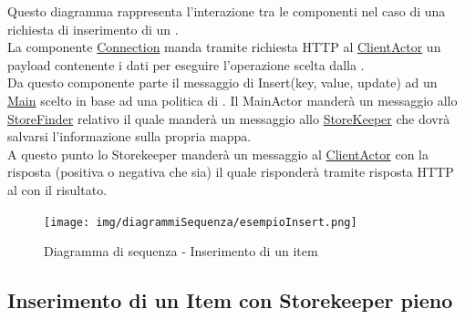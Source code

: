 \documentclass{scalatekids-article}
\begin{document}
Questo diagramma rappresenta l'interazione tra le componenti nel caso di una richiesta di inserimento di un .\\
La componente \hyperref[sec:actorbase::driver::client::Connection]{Connection}
manda tramite richiesta HTTP al \hyperref[sec:actorbase::actorsystem::clientactor::ClientActor]{ClientActor}
un payload contenente i dati per eseguire l'operazione scelta dalla .\\
Da questo componente parte il messaggio di Insert(key, value, update) ad un \hyperref[sec:actorbase::actorsystem::main::Main]{Main} scelto in base ad una
politica di . Il MainActor manderà un messaggio allo \hyperref[sec:actorbase::actorsystem::storefinder::StoreFinder]{StoreFinder} relativo il quale manderà un messaggio allo \hyperref[sec:actorbase::actorsystem::storekeeper::StoreKeeper]{StoreKeeper} che dovrà salvarsi l'informazione
sulla propria mappa.\\
A questo punto lo Storekeeper manderà un messaggio al \hyperref[sec:actorbase::actorsystem::clientactor::ClientActor]{ClientActor} con la risposta
(positiva o negativa che sia) il quale risponderà tramite risposta HTTP al  con il risultato.
\begin{figure}[H]
  \begin{center}
    \texttt{[image: img/diagrammiSequenza/esempioInsert.png]}
    \caption{Diagramma di sequenza - Inserimento di un item}
  \end{center}
\end{figure}

\subsection{Inserimento di un Item con Storekeeper pieno}
\end{document}
